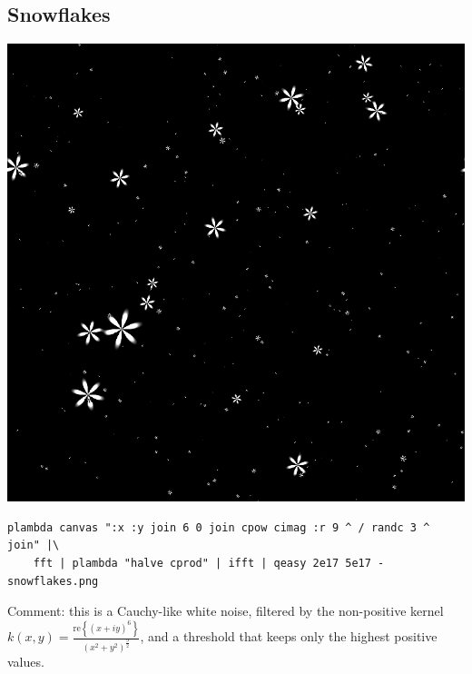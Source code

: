 \subsection{Snowflakes}
\includegraphics{snowflakes.png}
\begin{verbatim}
plambda canvas ":x :y join 6 0 join cpow cimag :r 9 ^ / randc 3 ^ join" |\
	fft | plambda "halve cprod" | ifft | qeasy 2e17 5e17 - snowflakes.png
\end{verbatim}
Comment: this is a Cauchy-like white noise, filtered by the non-positive
kernel~$k(x,y) =
\frac{\mathrm{re}\left\{(x+iy)^6\right\}}{(x^2+y^2)^\frac{9}{2}}$, and a
threshold that keeps only the highest positive values.


